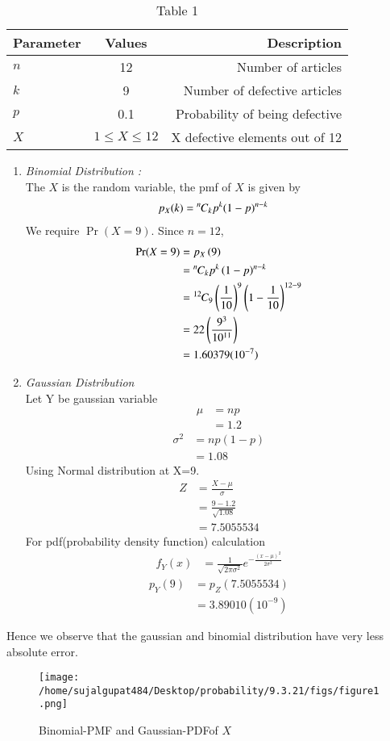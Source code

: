 \documentclass[journal,12pt,twocolumn]{IEEEtran}
\theoremstyle{remark}
\begin{document}
\solution
\begin{table}[h!]
 \begin{center}
    \begin{tabular}{|l|c|r|}
    \hline
    Parameter & Values & Description\\
    \hline
    $n$ & 12 & Number of articles\\
    \hline
    $k$ & 9 & Number of defective articles\\
    \hline
    $p$ & 0.1 & Probability of being defective\\
    \hline
    $X$ & $1\leq X \leq 12$
    & X defective elements out of 12\\
    \hline
    \end{tabular}
    \end{center}
    \caption{Table 1}
  \label{tab:ncert/9/3/21/} 
\end{table}
\begin{enumerate}
   \item{ \em{Binomial Distribution :}}\\The $X$ is the random variable, the pmf of $X$ is given by
    \begin{align}
p_X(k)&={{}^{n}\mkern-1muC_{k}}p^k(1-p)^{n-k}
\end{align}    
  We require $\Pr(X = 9)$. Since $n = 12$,
             \begin{align}
                \Pr(X = 9) &=  p_X\left(9\right) \\
                           &= {{}^{n}\mkern-1muC_{k}}p^k\left(1-p\right)^{n-k} \\
                           &={{}^{12}\mkern-1muC_{9}}\left(\frac{1}{10}\right)^9\left(1-\frac{1}{10}\right)^{12-9}\\
                           &= 22  \left(\frac{9^3}{10^{11}}\right)\\
                           &=1.60379(10^{-7})
             \end{align}
             
             \item{ \em{Gaussian Distribution}}\\
             Let Y be gaussian variable
\begin{align}
\mu&=np\\
&=1.2
\end{align}
\begin{align}
\sigma^2&=np(1-p)\\
&=1.08
\end{align}
Using Normal distribution at X=9.
\begin{align}
Z&=\frac{X-\mu}{\sigma}\\
&=\frac{9-1.2}{\sqrt{1.08}}\\
&=7.5055534
\end{align}
For pdf(probability density function) calculation
\begin{align}
f_Y(x)&=\frac{1}{\sqrt{2\pi\sigma^2}}e^{-\frac{(x-\mu)^2}{2\sigma^2}}
\end{align}
\begin{align}
p_Y(9)&=p_Z(7.5055534)\\
&=3.89010(10^{-9})
\end{align}
\end{enumerate}
Hence we observe that the gaussian and binomial distribution have very less absolute error.
\begin{figure}
\centering
\texttt{[image: /home/sujalgupat484/Desktop/probability/9.3.21/figs/figure1.png]}
\caption{ Binomial-PMF and Gaussian-PDFof $X$}
\end{figure}
\end{document}
